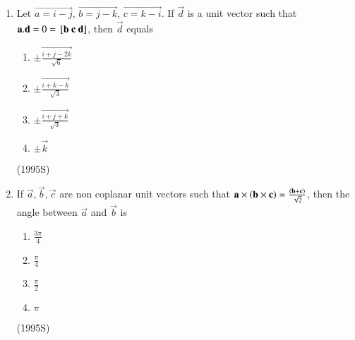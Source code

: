 \documentclass[journal]{IEEEtran}
\begin{document}
\begin{enumerate}
\item Let $\vec{a=i-j}$, $\vec{b=j-k}$, $\vec{c=k-i}$. If $\vec{d}$ is a unit vector such that $\mathbf{a}.\mathbf{d} = 0 = {}\left[\mathbf{b}\ \mathbf{c}\ \mathbf{d}\right]$, then $\vec{d}$ equals
\begin{enumerate}
\item $\pm \vec{\frac{{i+j-2k}}{\sqrt{6}}}$
\item $\pm \vec{\frac{{i+k-k}}{\sqrt{3}}}$
\item $\pm \vec{\frac{{i+j+k}}{\sqrt{3}}}$
\item $\pm \vec{k}$
\end{enumerate}
\hfill (1995S)

\item If $\vec{a},\vec{b},\vec{c}$ are non coplanar unit vectors such that $\mathbf{a}\times\left(\mathbf{b}\times\mathbf{c}\right) = \frac{\left(\mathbf{b}+\mathbf{c}\right)}{\sqrt{2}}$, then the angle between $\vec{a}$ and $\vec{b}$ is
\begin{enumerate}
\item $\frac{3\pi}{4}$
\item $\frac{\pi}{4}$
\item $\frac{\pi}{2}$
\item $\pi$
\end{enumerate}
\hfill (1995S)
\end{enumerate}
\end{document}
